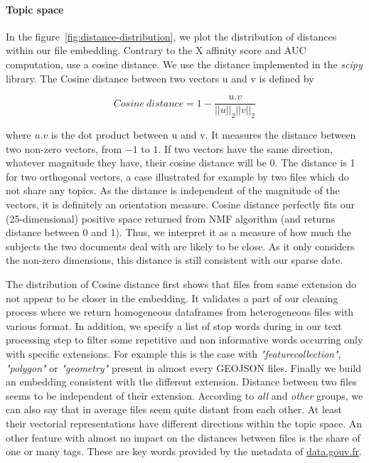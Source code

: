 \documentclass[a4paper]{article}
\begin{document}
	\paragraph{Topic space}
	
	In the figure~\ref{fig:distance-distribution}, we plot the distribution of distances within our file embedding. Contrary to the X affinity score and \ac{AUC} computation, use a cosine distance. We use the distance implemented in the \emph{scipy} library. The Cosine distance between two vectors u and v is defined by
	
	\[
	Cosine \: distance = 1 - \frac{u.v}{||u||_2||v||_2}
	\]
	
	where $u.v$ is the dot product between u and v. It measures the distance between two non-zero vectors, from $-1$ to $1$. If two vectors have the same direction, whatever magnitude they have, their cosine distance will be 0. The distance is 1 for two orthogonal vectors, a case illustrated for example by two files which do not share any topics. As the distance is independent of the magnitude of the vectors, it is definitely an orientation measure. Cosine distance perfectly fits our (25-dimensional) positive space returned from \ac{NMF} algorithm (and returns distance between 0 and 1). Thus, we interpret it as a measure of how much the subjects the two documents deal with are likely to be close. As it only considers the non-zero dimensions, this distance is still consistent with our sparse date. 
	
	The distribution of Cosine distance first shows that files from same extension do not appear to be closer in the embedding. It validates a part of our cleaning process where we return homogeneous dataframes from heterogeneous files with various format. In addition, we specify a list of stop words during in our text processing step to filter some repetitive and non informative words occurring only with specific extensions. For example this is the case with \textit{"featurecollection"}, \textit{"polygon"} or \textit{"geometry"} present in almost every GEOJSON files. Finally we build an embedding consistent with the different extension. Distance between two files seems to be independent of their extension. According to \emph{all} and \emph{other} groups, we can also say that in average files seem quite distant from each other. At least their vectorial representations have different directions within the topic space. An other feature with almost no impact on the distances between files is the share of one or many tags. These are key words provided by the metadata of \href{http://www.data.gouv.fr/fr/}{data.gouv.fr}.
	
\end{document}
